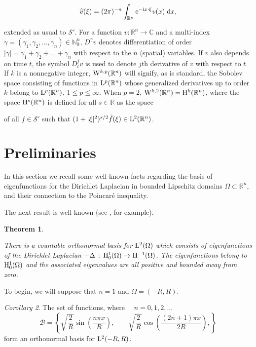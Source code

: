 \documentclass{amsart}
\newtheorem {Theorem}  {Theorem}
\numberwithin{Theorem}{section}
\numberwithin{equation}{section}
\theoremstyle{definition}
\theoremstyle{remark}
\newtheorem {Corollary}[Theorem]{Corollary}
\begin{document}
\[\widehat v(\xi) = (2\pi)^{-n}\int_{{\mathbb R}^n} {\rm e}^{-{\rm i}x\cdot\xi} v(x)\;{\rm d}x,\]

extended as usual to $\mathcal{S}'$. For a function $v:{{\mathbb R}^n}\to {{\mathbb C}}$ and a
multi-index ${\gamma}=({\gamma}_1,{\gamma}_2,\dots,{\gamma}_n)\in \mathbb{N}_0^n$, $D^{\gamma} v$ denotes differentiation of
order $|{\gamma}|={\gamma}_1+{\gamma}_2 + \dots + {\gamma}_n$ with respect to the $n$ (spatial) variables. If $v$ also
depends on time $t$, the symbol $D_t^jv$ is used to denote $j$th derivative of $v$ with respect to $t$.
If $k$ is a nonnegative integer, ${{\rm W}}^{k,p}({{\mathbb R}^n})$ will signify, as is standard, the Sobolev space consisting of functions in ${{\rm L}}^p({{\mathbb R}^n})$ whose generalized derivatives up to order $k$ belong to ${{\rm L}}^p({{\mathbb R}^n})$, $1\leq p \leq \infty$. When $p=2$, ${{\rm W}}^{k,2}({{\mathbb R}^n})={{\rm H}}^k({{\mathbb R}^n})$, where the space ${{\rm H}}^s({{\mathbb R}^n})$ is defined for all $s\in {{\mathbb R}}$ as the space

of all $f\in \mathcal{S}'$ such that $(1+|\xi|^2)^{s/2}\hat f(\xi)\in {{\rm L}}^2({{\mathbb R}^n})$.

\section{Preliminaries}

In this section we recall some well-known facts regarding the basis of eigenfunctions for the Dirichlet Laplacian in bounded Lipschitz domains $\Omega \subset \mathbb{R}^n$, and their connection to the Poincar\'e inequality.

The next result is well known (see \cite{Evans}, for example).

\begin{Theorem}\label{theo:evans}

There is a countable orthonormal basis for ${{\rm L}}^2(\Omega)$ which consists of eigenfunctions of the Dirichlet Laplacian $-\Delta\,:\, {{\rm H}}^1_0(\Omega) \mapsto {{\rm H}}^{-1}(\Omega)$.  The eigenfunctions belong to ${{\rm H}}^1_0(\Omega)$
and the associated eigenvalues are all positive and bounded away from zero.

\end{Theorem}

To begin, we will suppose that $n=1$ and $\Omega= (-R,R)$.

\begin{Corollary}\label{sc}
The set of functions, where $\quad n=0,1,2,\dots $
\[\mathcal{B} = \left\{\sqrt{\frac{2}{R}}\sin\left(\frac{n\pi x}{R}\right),\qquad \sqrt{\frac{2}{R}}\cos\left(\frac{(2n+1)\pi x}{2R}\right),\right\}
\]
form an orthonormal basis for ${{\rm L}}^2(-R,R)$.
\end{Corollary}
\end{document}
